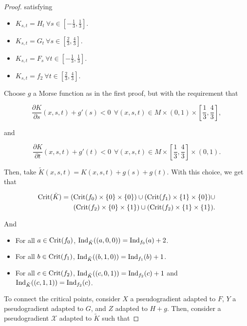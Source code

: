 \begin{proof}
satisfying

\begin{itemize}
	\item $K_{s,t} = H_t \ \forall s \in \left[-\frac13,\frac13\right]$.
	\item $K_{s,t} = G_t \ \forall s \in \left[\frac23,\frac43\right]$.
	\item $K_{s,t} = F_s \ \forall t \in \left[-\frac13,\frac13\right]$.
	\item $K_{s,t} = f_2 \ \forall t \in \left[\frac23,\frac43\right]$.
\end{itemize}

Choose $g$ a Morse function as in the first proof, but with the requirement that

\begin{displaymath}
\frac{\partial K}{\partial s}(x,s,t) + g'(s) < 0 \ \ \forall (x,s,t) \in M \times (0,1) \times \left[\frac13,\frac43\right] ,
\end{displaymath}

and

\begin{displaymath}
\frac{\partial K}{\partial t}(x,s,t) + g'(t) < 0 \ \ \forall (x,s,t) \in M \times \left[\frac13,\frac43\right] \times (0,1) .
\end{displaymath}

Then, take $\tilde{K}(x,s,t) = K(x,s,t) + g(s) + g(t)$. With this choice, we get that

\begin{eqnarray*}
\text{Crit}(\tilde{K}) = (\text{Crit}(f_0)\times \{0\} \times \{0\}) \cup (\text{Crit}(f_1) \times \{1\} \times \{0\}) \cup \\ (\text{Crit}(f_2) \times \{0\} \times \{1\}) \cup (\text{Crit}(f_2) \times \{1\} \times \{1\}) .
\end{eqnarray*}

And

\begin{itemize}
	\item For all $a \in \text{Crit}(f_0)$, $\text{Ind}_{\tilde{K}}((a,0,0)) = \text{Ind}_{f_0}(a) + 2$.
	\item For all $b \in \text{Crit}(f_1)$, $\text{Ind}_{\tilde{K}}((b,1,0)) = \text{Ind}_{f_1}(b) + 1$.
	\item For all $c \in \text{Crit}(f_2)$, $\text{Ind}_{\tilde{K}}((c,0,1)) = \text{Ind}_{f_2}(c) + 1$ and $\text{Ind}_{\tilde{K}}((c,1,1)) = \text{Ind}_{f_2}(c)$.
\end{itemize}

To connect the critical points, consider $X$ a pseudogradient adapted to $F$, $Y$ a pseudogradient adapted to $G$, and $Z$ adapted to $H + g$. Then, consider a pseudogradient $\mathcal{X}$ adapted to $\tilde{K}$ such that


\end{proof}
